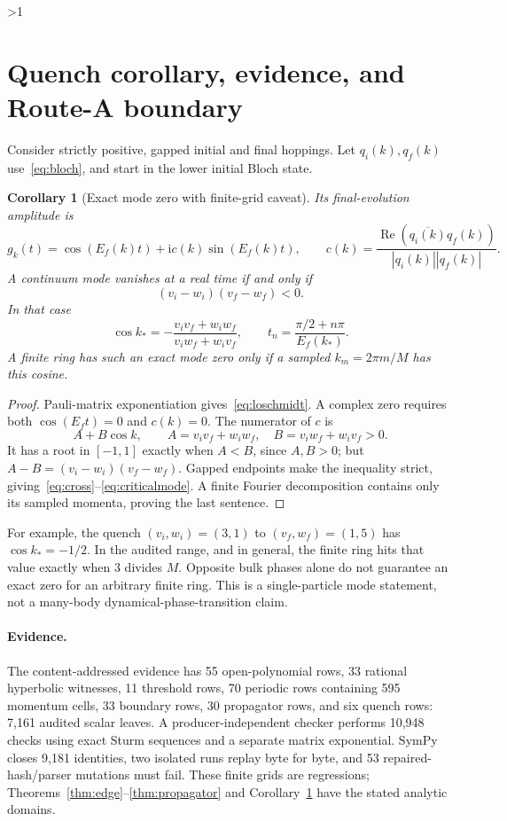\documentclass[10pt]{article}
\providecommand{\CRevisionRound}{2}
\newtheorem{corollary}[theorem]{Corollary}
\newcommand{\iu}{\mathrm{i}}
\begin{document}
\ifnum\CRevisionRound>1
\section{Quench corollary, evidence, and Route-A boundary}
Consider strictly positive, gapped initial and final hoppings.  Let
$q_i(k),q_f(k)$ use~\eqref{eq:bloch}, and start in the lower initial Bloch
state.

\begin{corollary}[Exact mode zero with finite-grid caveat]\label{cor:quench}
Its final-evolution amplitude is
\begin{equation}\label{eq:loschmidt}
 g_k(t)=\cos(E_f(k)t)+\iu c(k)\sin(E_f(k)t),\qquad
 c(k)=\frac{\operatorname{Re}(\overline{q_i(k)}q_f(k))}
 {|q_i(k)||q_f(k)|}.
\end{equation}
A continuum mode vanishes at a real time if and only if
\begin{equation}\label{eq:cross}
 (v_i-w_i)(v_f-w_f)<0.
\end{equation}
In that case
\begin{equation}\label{eq:criticalmode}
 \cos k_*=-\frac{v_iv_f+w_iw_f}{v_iw_f+w_iv_f},\qquad
 t_n=\frac{\pi/2+n\pi}{E_f(k_*)}.
\end{equation}
A finite ring has such an exact mode zero only if a sampled
$k_m=2\pi m/M$ has this cosine.
\end{corollary}
\begin{proof}
Pauli-matrix exponentiation gives~\eqref{eq:loschmidt}.  A complex zero
requires both $\cos(E_ft)=0$ and $c(k)=0$.  The numerator of $c$ is
\[
 A+B\cos k,\qquad A=v_iv_f+w_iw_f,\quad B=v_iw_f+w_iv_f>0.
\]
It has a root in $[-1,1]$ exactly when $A<B$, since $A,B>0$; but
$A-B=(v_i-w_i)(v_f-w_f)$.  Gapped endpoints make the inequality strict,
giving~\eqref{eq:cross}--\eqref{eq:criticalmode}.  A finite Fourier
decomposition contains only its sampled momenta, proving the last sentence.
\end{proof}

For example, the quench $(v_i,w_i)=(3,1)$ to $(v_f,w_f)=(1,5)$ has
$\cos k_*=-1/2$.  In the audited range, and in general, the finite ring hits
that value exactly when $3$ divides $M$.  Opposite bulk phases alone do not
guarantee an exact zero for an arbitrary finite ring.  This is a
single-particle mode statement, not a many-body dynamical-phase-transition
claim.

\paragraph{Evidence.}
The content-addressed evidence has 55 open-polynomial rows, 33 rational
hyperbolic witnesses, 11 threshold rows, 70 periodic rows containing 595
momentum cells, 33 boundary rows, 30 propagator rows, and six quench rows:
7,161 audited scalar leaves.  A producer-independent checker performs
10,948 checks using exact Sturm sequences and a separate matrix exponential.
SymPy closes 9,181 identities, two isolated runs replay byte for byte, and
53 repaired-hash/parser mutations must fail.  These finite grids are
regressions; Theorems~\ref{thm:edge}--\ref{thm:propagator} and
Corollary~\ref{cor:quench} have the stated analytic domains.
\end{document}
